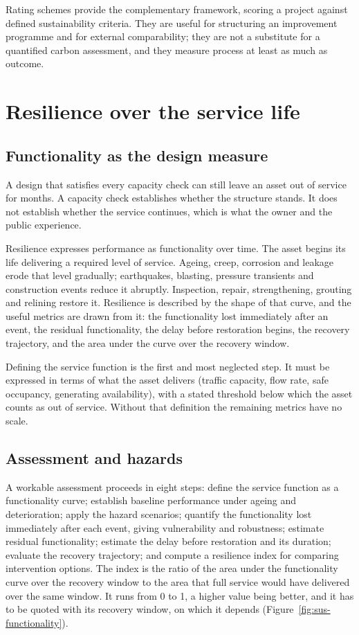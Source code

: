 Rating schemes provide the complementary framework, scoring a project against
defined sustainability criteria. They are useful for structuring an
improvement programme and for external comparability; they are not a
substitute for a quantified carbon assessment, and they measure process at
least as much as outcome.

\section{Resilience over the service life}
\label{sec:resilience}

\subsection{Functionality as the design measure}
\label{sec:functionality-measure}

A design that satisfies every capacity check can still leave an asset out of
service for months. A capacity check establishes whether the structure stands. It does not
establish whether the service continues, which is what the owner and the public
experience.

Resilience expresses performance as functionality over time. The asset begins
its life delivering a required level of service. Ageing, creep, corrosion and
leakage erode that level gradually; earthquakes, blasting, pressure transients
and construction events reduce it abruptly. Inspection, repair, strengthening,
grouting and relining restore it. Resilience is described by the shape of that curve, and
the useful metrics are drawn from it: the functionality lost immediately after
an event, the residual functionality, the delay before restoration begins, the
recovery trajectory, and the area under the curve over the recovery window.

Defining the service function is the first and most neglected step. It must be
expressed in terms of what the asset delivers (traffic capacity, flow
rate, safe occupancy, generating availability), with a stated threshold
below which the asset counts as out of service. Without that definition the
remaining metrics have no scale.

\subsection{Assessment and hazards}
\label{sec:resilience-assessment}

A workable assessment proceeds in eight steps: define the service function as
a functionality curve; establish baseline performance under ageing and
deterioration; apply the hazard scenarios; quantify the functionality lost
immediately after each event, giving vulnerability and robustness; estimate
residual functionality; estimate the delay before restoration and its
duration; evaluate the recovery trajectory; and compute a resilience index for
comparing intervention options. The index is the ratio of the area under the
functionality curve over the recovery window to the area that full service
would have delivered over the same window. It runs from 0 to 1, a higher
value being better, and it has to be quoted with its recovery window, on
which it depends (Figure~\ref{fig:sus-functionality}).

